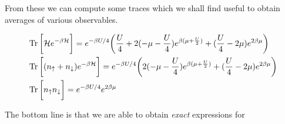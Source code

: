 From these we can compute some traces which we shall find useful to obtain averages of various observables.

\begin{equation}
\begin{split}
&\operatorname{Tr} \bigg[ \mathcal{H} e^{-\beta\mathcal{H} } \bigg] = e^{-\beta U / 4} \bigg(\frac{U}{4} + 2 (-\mu - \frac{U}{4})  e^{\beta(\mu + \frac{U}{2})} + (\frac{U}{4} - 2\mu ) e^{2\beta \mu} \bigg) \\
&\operatorname{Tr} \bigg[ (n_\uparrow + n_\downarrow ) e^{-\beta\mathcal{H} } \bigg] = e^{-\beta U / 4} \bigg(2 (-\mu - \frac{U}{4})  e^{\beta(\mu + \frac{U}{2})} + (\frac{U}{4} - 2\mu ) e^{2\beta \mu} \bigg) \\
&\operatorname{Tr} \bigg[ n_\uparrow n_\downarrow \bigg] = e^{-\beta U/4} e^{2\beta\mu}
\end{split}
\end{equation}

The bottom line is that we are able to obtain \emph{exact} expressions for

